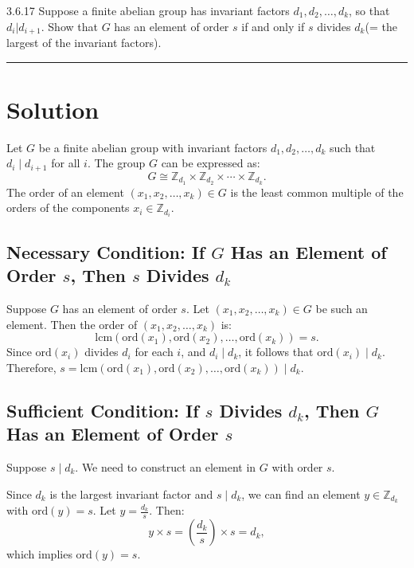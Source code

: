 \documentclass[12pt]{amsart}
\theoremstyle{definition}
\numberwithin{equation}{section}
\newcommand{\Z}{\mathbb{Z}}
\begin{document}
\begin{exercise}{3.6.17} Suppose a finite abelian group has invariant factors \(d_1,d_2,\dots,d_k\), so that \(d_i|d_{i+1}\). Show that \(G\) has an element of order \(s\) if and only if \(s\) divides \(d_k\)(= the largest of the invariant factors). 

    \noindent\rule{\linewidth}{1pt}

    \section*{Solution}

    Let \(G\) be a finite abelian group with invariant factors \(d_1, d_2, \ldots, d_k\) such that \(d_i \mid d_{i+1}\) for all \(i\). The group \(G\) can be expressed as:
    \[
    G \cong \Z_{d_1} \times \Z_{d_2} \times \cdots \times \Z_{d_k}.
    \]
    The order of an element \((x_1, x_2, \ldots, x_k) \in G\) is the least common multiple of the orders of the components \(x_i \in \Z_{d_i}\).

    \subsection*{Necessary Condition: If \(G\) Has an Element of Order \(s\), Then \(s\) Divides \(d_k\)}

    Suppose \(G\) has an element of order \(s\). Let \((x_1, x_2, \ldots, x_k) \in G\) be such an element. Then the order of \((x_1, x_2, \ldots, x_k)\) is:
    \[
    \text{lcm}(\text{ord}(x_1), \text{ord}(x_2), \ldots, \text{ord}(x_k)) = s.
    \]
    Since \(\text{ord}(x_i)\) divides \(d_i\) for each \(i\), and \(d_i \mid d_k\), it follows that \(\text{ord}(x_i) \mid d_k\). Therefore, \(s = \text{lcm}(\text{ord}(x_1), \text{ord}(x_2), \ldots, \text{ord}(x_k)) \mid d_k\).

    \subsection*{Sufficient Condition: If \(s\) Divides \(d_k\), Then \(G\) Has an Element of Order \(s\)}

    Suppose \(s \mid d_k\). We need to construct an element in \(G\) with order \(s\).

    Since \(d_k\) is the largest invariant factor and \(s \mid d_k\), we can find an element \(y \in \Z_{d_k}\) with \(\text{ord}(y) = s\). Let \(y = \frac{d_k}{s}\). Then:
    \[
    y \times s = \left(\frac{d_k}{s}\right) \times s = d_k,
    \]
    which implies \(\text{ord}(y) = s\).


\end{exercise}
\end{document}
